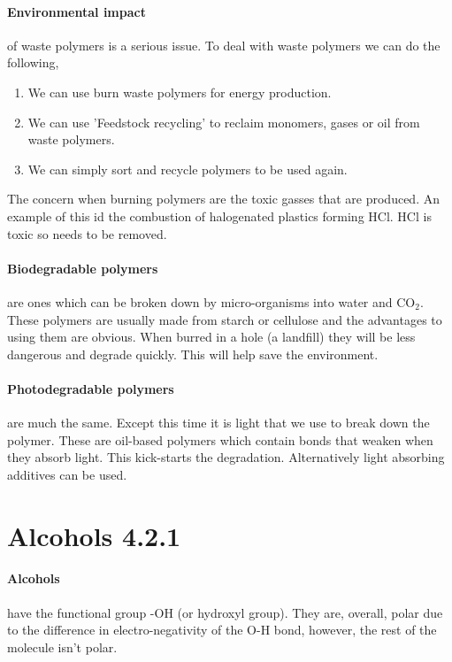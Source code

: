 	\begin{center}
	\end{center}
	
	\paragraph{Environmental impact} of waste polymers is a serious issue.
	To deal with waste polymers we can do the following,
	\begin{enumerate}
		\item We can use burn waste polymers for energy production.
		\item We can use 'Feedstock recycling' to reclaim monomers, gases or oil from waste polymers.
		\item We can simply sort and recycle polymers to be used again.
	\end{enumerate}
	The concern when burning polymers are the toxic gasses that are produced.
	An example of this id the combustion of halogenated plastics forming HCl.
	HCl is toxic so needs to be removed. %
	
	\paragraph{Biodegradable polymers} are ones which can be broken down by micro-organisms into water and CO$_2$.
	These polymers are usually made from starch or cellulose and the advantages to using them are obvious. When burred in a hole (a landfill) they will be less dangerous and degrade quickly.
	This will help save the environment.
	
	\paragraph{Photodegradable polymers} are much the same.
	Except this time it is light that we use to break down the polymer.
	These are oil-based polymers which contain bonds that weaken when they absorb light.
	This kick-starts the degradation. Alternatively light absorbing additives can be used.
	
\section{Alcohols 4.2.1}

	\paragraph{Alcohols} have the functional group -OH (or hydroxyl group).
	They are, overall, polar due to the difference in electro-negativity of the O-H bond, however, the rest of the molecule isn't polar.
	
